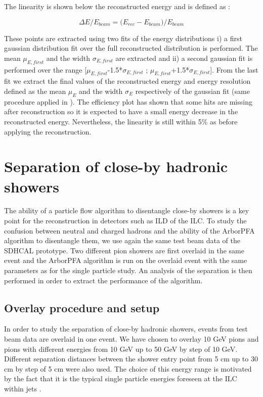 \documentclass[cits]{JINST}
\begin{document}
The linearity is shown below the reconstructed energy and is defined as :

\begin{equation}
  \Delta E/E_{beam} = \Big(E_{rec} - E_{beam}\Big)/E_{beam}
\end{equation}

These points are extracted using two fits of the energy distributions i) a first gaussian distribution fit over the full reconstructed distribution is performed. The mean $\mu_{E,first}$ and the width $\sigma_{E,first}$ are extracted and ii) a second gaussian fit is performed over the range [$\mu_{E,first}$-1.5*$\sigma_{E,first}$ ; $\mu_{E,first}$+1.5*$\sigma_{E,first}$]. From the last fit we extract the final values of the reconstructed energy and energy resolution defined as the mean $\mu_E$ and the width $\sigma_E$ respectively of the gaussian fit (same procedure applied in \cite{sdhcal-paper}). The efficiency plot has shown that some hits are missing after reconstruction so it is expected to have a small energy decrease in the reconstructed energy. Nevertheless, the linearity is still within 5\% as before applying the reconstruction.

\newpage
\section{Separation of close-by hadronic showers}

The ability of a particle flow algorithm to disentangle close-by showers is a key point for the reconstruction in detectors such as ILD of the ILC. To study the confusion between neutral and charged hadrons and the ability of the ArborPFA algorithm to disentangle them, we use again the same test beam data of the SDHCAL prototype. Two different pion showers are first overlaid in the same event and the ArborPFA algorithm is run on the overlaid event with the same parameters as for the single particle study. An analysis of the separation is then performed in order to extract the performance of the algorithm.

\subsection{Overlay procedure and setup}

In order to study the separation of close-by hadronic showers, events from test beam data are overlaid in one event. We have chosen to overlay 10 GeV pions and pions with different energies from 10 GeV up to 50 GeV by step of 10 GeV. Different separation distances between the shower entry point from 5 cm up to 30 cm by step of 5 cm were also used. The choice of this energy range is motivated by the fact that it is the typical single particle energies foreseen at the ILC within jets \cite{ilc-tdr}.
\end{document}
